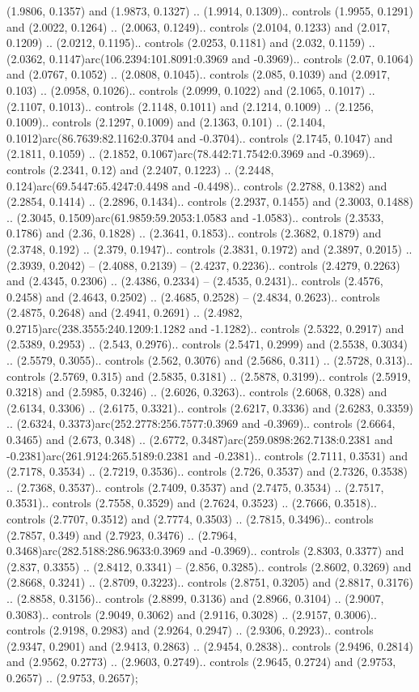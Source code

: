 (1.9806, 0.1357) and (1.9873, 0.1327) .. (1.9914, 0.1309).. controls (1.9955, 0.1291) and (2.0022, 0.1264) .. (2.0063, 0.1249).. controls (2.0104, 0.1233) and (2.017, 0.1209) .. (2.0212, 0.1195).. controls (2.0253, 0.1181) and (2.032, 0.1159) .. (2.0362, 0.1147)arc(106.2394:101.8091:0.3969 and -0.3969).. controls (2.07, 0.1064) and (2.0767, 0.1052) .. (2.0808, 0.1045).. controls (2.085, 0.1039) and (2.0917, 0.103) .. (2.0958, 0.1026).. controls (2.0999, 0.1022) and (2.1065, 0.1017) .. (2.1107, 0.1013).. controls (2.1148, 0.1011) and (2.1214, 0.1009) .. (2.1256, 0.1009).. controls (2.1297, 0.1009) and (2.1363, 0.101) .. (2.1404, 0.1012)arc(86.7639:82.1162:0.3704 and -0.3704).. controls (2.1745, 0.1047) and (2.1811, 0.1059) .. (2.1852, 0.1067)arc(78.442:71.7542:0.3969 and -0.3969).. controls (2.2341, 0.12) and (2.2407, 0.1223) .. (2.2448, 0.124)arc(69.5447:65.4247:0.4498 and -0.4498).. controls (2.2788, 0.1382) and (2.2854, 0.1414) .. (2.2896, 0.1434).. controls (2.2937, 0.1455) and (2.3003, 0.1488) .. (2.3045, 0.1509)arc(61.9859:59.2053:1.0583 and -1.0583).. controls (2.3533, 0.1786) and (2.36, 0.1828) .. (2.3641, 0.1853).. controls (2.3682, 0.1879) and (2.3748, 0.192) .. (2.379, 0.1947).. controls (2.3831, 0.1972) and (2.3897, 0.2015) .. (2.3939, 0.2042) -- (2.4088, 0.2139) -- (2.4237, 0.2236).. controls (2.4279, 0.2263) and (2.4345, 0.2306) .. (2.4386, 0.2334) -- (2.4535, 0.2431).. controls (2.4576, 0.2458) and (2.4643, 0.2502) .. (2.4685, 0.2528) -- (2.4834, 0.2623).. controls (2.4875, 0.2648) and (2.4941, 0.2691) .. (2.4982, 0.2715)arc(238.3555:240.1209:1.1282 and -1.1282).. controls (2.5322, 0.2917) and (2.5389, 0.2953) .. (2.543, 0.2976).. controls (2.5471, 0.2999) and (2.5538, 0.3034) .. (2.5579, 0.3055).. controls (2.562, 0.3076) and (2.5686, 0.311) .. (2.5728, 0.313).. controls (2.5769, 0.315) and (2.5835, 0.3181) .. (2.5878, 0.3199).. controls (2.5919, 0.3218) and (2.5985, 0.3246) .. (2.6026, 0.3263).. controls (2.6068, 0.328) and (2.6134, 0.3306) .. (2.6175, 0.3321).. controls (2.6217, 0.3336) and (2.6283, 0.3359) .. (2.6324, 0.3373)arc(252.2778:256.7577:0.3969 and -0.3969).. controls (2.6664, 0.3465) and (2.673, 0.348) .. (2.6772, 0.3487)arc(259.0898:262.7138:0.2381 and -0.2381)arc(261.9124:265.5189:0.2381 and -0.2381).. controls (2.7111, 0.3531) and (2.7178, 0.3534) .. (2.7219, 0.3536).. controls (2.726, 0.3537) and (2.7326, 0.3538) .. (2.7368, 0.3537).. controls (2.7409, 0.3537) and (2.7475, 0.3534) .. (2.7517, 0.3531).. controls (2.7558, 0.3529) and (2.7624, 0.3523) .. (2.7666, 0.3518).. controls (2.7707, 0.3512) and (2.7774, 0.3503) .. (2.7815, 0.3496).. controls (2.7857, 0.349) and (2.7923, 0.3476) .. (2.7964, 0.3468)arc(282.5188:286.9633:0.3969 and -0.3969).. controls (2.8303, 0.3377) and (2.837, 0.3355) .. (2.8412, 0.3341) -- (2.856, 0.3285).. controls (2.8602, 0.3269) and (2.8668, 0.3241) .. (2.8709, 0.3223).. controls (2.8751, 0.3205) and (2.8817, 0.3176) .. (2.8858, 0.3156).. controls (2.8899, 0.3136) and (2.8966, 0.3104) .. (2.9007, 0.3083).. controls (2.9049, 0.3062) and (2.9116, 0.3028) .. (2.9157, 0.3006).. controls (2.9198, 0.2983) and (2.9264, 0.2947) .. (2.9306, 0.2923).. controls (2.9347, 0.2901) and (2.9413, 0.2863) .. (2.9454, 0.2838).. controls (2.9496, 0.2814) and (2.9562, 0.2773) .. (2.9603, 0.2749).. controls (2.9645, 0.2724) and (2.9753, 0.2657) .. (2.9753, 0.2657);



